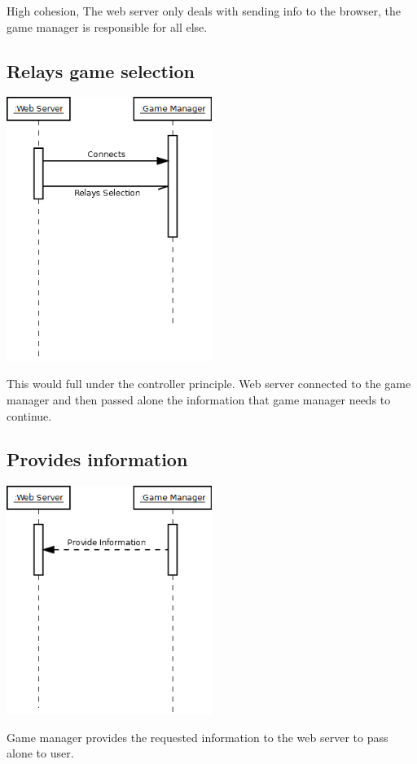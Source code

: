 	High cohesion, The web server only deals with sending info to the browser, the game manager is responsible for all else.
	
	\subsection{Relays game selection}
	\includegraphics[width=0.50\textwidth]{./Interact4.png}
	
	This would full under the controller principle. Web server connected to the game manager and then passed alone the information that game manager needs to continue.
	
	\subsection{Provides information}
	\includegraphics[width=0.50\textwidth]{./Interact5.png}
	
	Game manager provides the requested information to the web server to pass alone to user.
	
